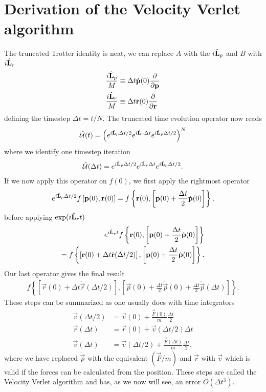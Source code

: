 \section{Derivation of the Velocity Verlet algorithm}
The truncated Trotter identity is neat, we can replace $A$ with the $i\hat{\mathbf L}_p$ and $B$ with $i\hat{\mathbf L}_r$
\begin{align}
	\frac{i\hat{\mathbf L}_p}{M} &\equiv \Delta t\dot{\mathbf p}(0)\frac{\partial}{\partial \mathbf p}\\
	\frac{i\hat{\mathbf L}_r}{M} &\equiv \Delta t\dot{\mathbf r}(0)\frac{\partial}{\partial \mathbf r}
\end{align}
defining the timestep $\Delta t = t/N$. The truncated time evolution operator now reads
\begin{align}
	\hat {\mathcal U} (t) = \left(e^{i\hat{\mathbf L}_p \Delta t/2}e^{i\hat{\mathbf L}_r \Delta t}e^{i\hat{\mathbf L}_p \Delta t/2}\right)^N
\end{align}
where we identify one timestep iteration
\begin{align}
	\hat {\mathcal U} (\Delta t) = e^{i\hat{\mathbf L}_p \Delta t/2}e^{i\hat{\mathbf L}_r \Delta t}e^{i\hat{\mathbf L}_p \Delta t/2}.
\end{align}
If we now apply this operator on $f(0)$, we first apply the rightmost operator
\begin{align}
	e^{i\hat{\mathbf L}_p \Delta t/2}f\left[\mathbf p(0), \mathbf r(0)\right] = f\left\{\mathbf r(0), \left[\mathbf p(0) + \frac{\Delta t}{2}\dot{\mathbf p}(0)\right] \right\},
\end{align}
before applying $\exp(i\hat{\mathbf L}_r t)$
\begin{align}
	e^{i\hat{\mathbf L}_r t}f\left\{\mathbf r(0), \left[\mathbf p(0) + \frac{\Delta t}{2}\dot{\mathbf p}(0)\right] \right\}\\
	= f\left\{\left[\mathbf r(0) + \Delta t \dot{\mathbf r}(\Delta t/2)\right], \left[\mathbf p(0) + \frac{\Delta t}{2}\dot{\mathbf p}(0)\right] \right\}.
\end{align}
Our last operator gives the final result
\begin{align}
	f\left\{\left[\vec r(0) + \Delta t \dot{\vec r}(\Delta t/2)\right], \left[\vec p(0) + \frac{\Delta t}{2}\dot{\vec p}(0) + \frac{\Delta t}{2}\dot{\vec p}(\Delta t)\right] \right\}.
\end{align}
These steps can be summarized as one usually does with time integrators
\begin{align}
	\vec v(\Delta t/2) &= \vec v(0) + \frac{\vec F(0)}{m}\frac{\Delta t}{2}\\
	\vec r(\Delta t) &= \vec r(0) + \vec v(\Delta t/2)\Delta t\\
	\vec v(\Delta t) &= \vec v(\Delta t/2) + \frac{\vec F(\Delta t)}{m}\frac{\Delta t}{2},
\end{align}
where we have replaced $\dot{\vec p}$ with the equivalent $(\vec F/m)$ and $\dot{\vec r}$ with $\vec v$ which is valid if the forces can be calculated from the position. These steps are called the Velocity Verlet algorithm and has, as we now will see, an error $O(\Delta t^3)$.


